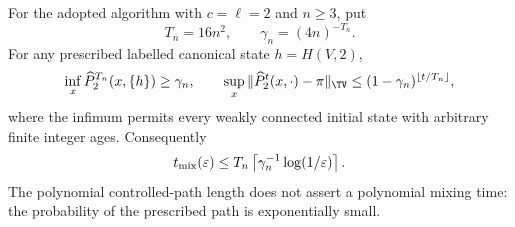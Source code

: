 \begin{theorem}
\label{thm:c2quadraticwitness}
For the adopted algorithm with $c=\ell=2$ and $n\ge3$, put
\[
 T_n=16n^2,\qquad \gamma_n=(4n)^{-T_n}.
\]
For any prescribed labelled canonical state $h=H(V,2)$,
\[
 \inf_x\widehat P_2^{T_n}(x,\{h\})\ge\gamma_n,
 \qquad
 \sup_x\|\widehat P_2^t(x,\cdot)-\pi\|_{\TV}
 \le(1-\gamma_n)^{\lfloor t/T_n\rfloor},
\]
where the infimum permits every weakly connected initial
state with arbitrary finite integer ages.
Consequently
\[
 t_{\rm mix}(\varepsilon)
 \le T_n\left\lceil\gamma_n^{-1}
                  \log(1/\varepsilon)\right\rceil.
\]
The polynomial controlled-path length does not assert a
polynomial mixing time: the probability of the prescribed
path is exponentially small.
\end{theorem}

